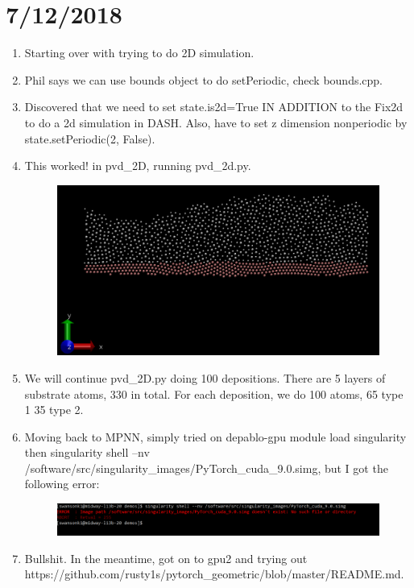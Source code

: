 \documentclass[12pt,reqno]{amsart}
\numberwithin{equation}{section}
\begin{document}
\section{7/12/2018}
\begin{enumerate}
\item Starting over with trying to do 2D simulation. 
\item Phil says we can use bounds object to do setPeriodic, check bounds.cpp.  
\item Discovered that we need to set state.is2d=True IN ADDITION to the Fix2d to do a 2d simulation in DASH. Also, have to set z dimension nonperiodic by state.setPeriodic(2, False).  
\item This worked!  in pvd\_2D, running pvd\_2d.py.  
\begin{figure}[H]
\centering
\includegraphics[scale=0.6]{pvd-first}
\end{figure}
\item We will continue pvd\_2D.py doing 100 depositions.  There are 5 layers of substrate atoms, 330 in total.  For each deposition, we do 100 atoms, 65 type 1 35 type 2.  
\item Moving back to MPNN, simply tried on depablo-gpu module load singularity then singularity shell --nv /software/src/singularity\_images/PyTorch\_cuda\_9.0.simg, but I got the following error:
\begin{figure}[H]
\centering
\includegraphics[scale=0.6]{singularity-error}
\end{figure}
\item Bullshit.  In the meantime, got on to gpu2 and trying out https://github.com/rusty1s/pytorch\_geometric/blob/master/README.md.  

\end{enumerate}
\end{document}
